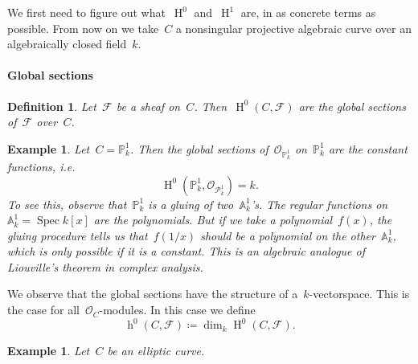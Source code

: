 \documentclass[10pt,a4paper]{article}
\theoremstyle{lecture}
\newtheorem{definition}[theorem]{Definition}
\newtheorem{example}[theorem]{Example}
\newcommand\dash{\nobreakdash-\hspace{0pt}}
\DeclareMathOperator\hh{h}
\DeclareMathOperator\HH{H}
\DeclareMathOperator\Spec{Spec}
\begin{document}
We first need to figure out what~$\HH^0$ and~$\HH^1$ are, in as concrete terms as possible. From now on we take~$C$ a nonsingular projective algebraic curve over an algebraically closed field~$k$.
\paragraph{Global sections}
\begin{definition}
  Let~$\mathcal{F}$ be a sheaf on~$C$. Then~$\HH^0(C,\mathcal{F})$ are the \emph{global sections} of~$\mathcal{F}$ over~$C$.
\end{definition}
\begin{example}
  Let~$C=\mathbb{P}_k^1$. Then the global sections of~$\mathcal{O}_{\mathbb{P}_k^1}$ on~$\mathbb{P}_k^1$ are the constant functions, i.e.
  \begin{equation}
    \HH^0(\mathbb{P}_k^1,\mathcal{O}_{\mathcal{P}_k^1})=k.
  \end{equation}
  To see this, observe that~$\mathbb{P}_k^1$ is a gluing of two~$\mathbb{A}_k^1$'s. The regular functions on~$\mathbb{A}_k^1=\Spec k[x]$ are the polynomials. But if we take a polynomial~$f(x)$, the gluing procedure tells us that~$f(1/x)$ should be a polynomial on the other~$\mathbb{A}_k^1$, which is only possible if it is a constant. This is an algebraic analogue of \emph{Liouville's theorem} in complex analysis.
\end{example}
We observe that the global sections have the structure of a~$k$\dash vectorspace. This is the case for all~$\mathcal{O}_C$\dash modules. In this case we define
\begin{equation}
  \hh^0(C,\mathcal{F})\coloneqq\dim_k\HH^0(C,\mathcal{F}).
\end{equation}
\begin{example}
  Let~$C$ be an elliptic curve\expand.
\end{example}
\end{document}
